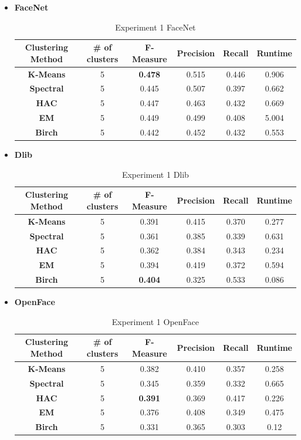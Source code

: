 \documentclass[12pt,english]{article}
\begin{document}
\begin{itemize}
\item \textbf{FaceNet}
\begin{table}[H]
\centering
\begin{tabular}{||c c c c c c||} 
 \hline
 Clustering Method & \# of clusters & F-Measure & Precision & Recall & Runtime\\ [0.5ex]
 \hline\hline
 \textbf{K-Means} & 5 & \textbf{0.478} & 0.515 & 0.446 & 0.906\\ 
 \hline
  \textbf{Spectral} & 5 & 0.445 & 0.507 & 0.397 & 0.662\\
 \hline
 \textbf{HAC} & 5 & 0.447 & 0.463 & 0.432 & 0.669\\
 \hline
 \textbf{EM} & 5 & 0.449 & 0.499 & 0.408 & 5.004\\
 \hline
 \textbf{Birch} & 5 & 0.442 & 0.452 & 0.432 & 0.553\\
 \hline
\end{tabular}
\caption{Experiment 1 FaceNet}
\label{table:ex1facenet}
\end{table}

\item \textbf{Dlib}
\begin{table}[H]
\centering
\begin{tabular}{||c c c c c c||} 
 \hline
 Clustering Method & \# of clusters & F-Measure & Precision & Recall & Runtime\\ [0.5ex]
 \hline\hline
 \textbf{K-Means} & 5 & 0.391 & 0.415 & 0.370 & 0.277\\ 
 \hline
  \textbf{Spectral} & 5 & 0.361 & 0.385 & 0.339 & 0.631\\
 \hline
 \textbf{HAC} & 5 & 0.362 & 0.384 & 0.343 & 0.234\\
 \hline
 \textbf{EM} & 5 & 0.394 & 0.419 & 0.372 & 0.594\\
 \hline
 \textbf{Birch} & 5 & \textbf{0.404} & 0.325 & 0.533 & 0.086\\
 \hline
\end{tabular}
\caption{Experiment 1 Dlib}
\label{table:ex1dlib}
\end{table}

\item \textbf{OpenFace}
\begin{table}[H]
\centering
\begin{tabular}{||c c c c c c||} 
 \hline
 Clustering Method & \# of clusters & F-Measure & Precision & Recall & Runtime\\ [0.5ex]
 \hline\hline
 \textbf{K-Means} & 5 & 0.382 & 0.410 & 0.357 & 0.258\\ 
 \hline
  \textbf{Spectral} & 5 & 0.345 & 0.359 & 0.332 & 0.665\\
 \hline
 \textbf{HAC} & 5 & \textbf{0.391} & 0.369 & 0.417 & 0.226\\
 \hline
 \textbf{EM} & 5 & 0.376 & 0.408 & 0.349 & 0.475\\
 \hline
 \textbf{Birch} & 5 & 0.331 & 0.365 & 0.303 & 0.12\\
 \hline
\end{tabular}
\caption{Experiment 1 OpenFace}
\label{table:ex1openface}
\end{table}


\end{itemize}
\end{document}
